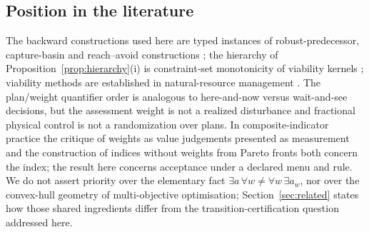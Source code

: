 \documentclass[preprint,11pt,authoryear]{elsarticle}
\theoremstyle{definition}
\theoremstyle{remark}
\begin{document}
\subsection{Position in the literature}

The backward constructions used here are typed instances of robust-predecessor, capture-basin and reach--avoid constructions \citep{Aubin1991,Aubin2011,SaintPierre1994,Lygeros1999,AubinCatte2002}; the hierarchy of Proposition~\ref{prop:hierarchy}(i) is constraint-set monotonicity of viability kernels \citep{Aubin1991,Frankowska1989}; viability methods are established in natural-resource management \citep{DeLaraDoyen2008,Doyen2012}. The plan/weight quantifier order is analogous to here-and-now versus wait-and-see decisions, but the assessment weight is not a realized disturbance and fractional physical control is not a randomization over plans. In composite-indicator practice the critique of weights as value judgements presented as measurement \citep{Hickel2020,Fischer2022} and the construction of indices without weights from Pareto fronts \citep{Gao2023} both concern the index; the result here concerns acceptance under a declared menu and rule. We do not assert priority over the elementary fact $\exists a\,\forall w\ne\forall w\,\exists a_w$, nor over the convex-hull geometry of multi-objective optimisation; Section~\ref{sec:related} states how those shared ingredients differ from the transition-certification question addressed here.
\end{document}
